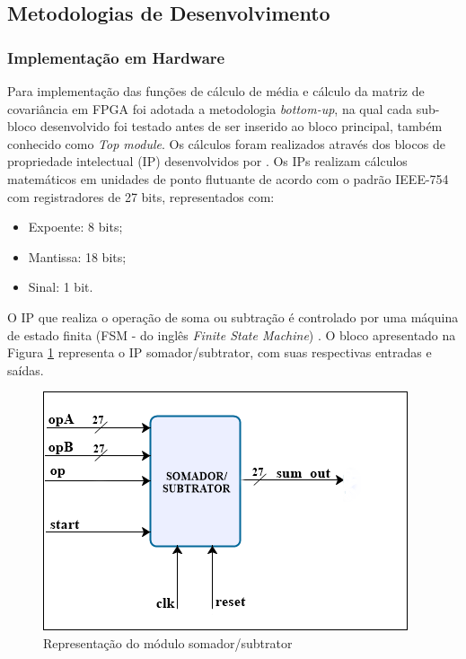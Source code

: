 \subsection{Metodologias de Desenvolvimento}
\subsubsection{Implementação em Hardware}
Para implementação das funções de cálculo de média e cálculo da matriz de covariância em FPGA foi adotada a metodologia \textit{bottom-up}, na qual cada sub-bloco desenvolvido foi testado antes de ser inserido ao bloco principal, também conhecido como \textit{Top module}.
Os cálculos foram realizados através dos blocos de propriedade intelectual (IP) desenvolvidos por \cite{munoz2010tradeoff}. Os IPs realizam cálculos matemáticos em unidades de ponto flutuante de acordo com o padrão IEEE-754 \cite{IEEE745} com registradores de 27 bits, representados com:
\begin{itemize}
	\item Expoente: 8 bits;
	\item Mantissa: 18 bits;
	\item Sinal: 1 bit.
\end{itemize}

O IP que realiza o operação de soma ou subtração é controlado por uma máquina de estado finita (FSM - do inglês \textit{Finite State Machine}) \cite{munoz2010tradeoff}. O bloco apresentado na Figura \ref{somador_27} representa o IP somador/subtrator, com suas respectivas entradas e saídas.

\begin{figure}[h]
	\centering
	\includegraphics[keepaspectratio=true,scale=1]{figuras/bloco_soma.PNG}
	\caption{Representação do módulo somador/subtrator}
	\label{somador_27}
\end{figure}

